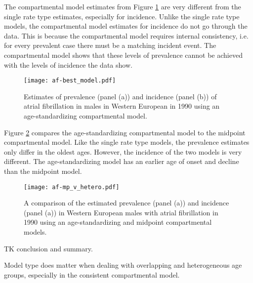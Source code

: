 The compartmental model estimates from Figure \ref{fig:app-af age-stand} 
are very different from the single rate type estimates, especially for incidence.  
Unlike the single rate type models, the compartmental model estimates for 
incidence do not go through the data.  This is because the compartmental model 
requires internal consistency, i.e. for every prevalent case there must be 
a matching incident event.  The compartmental model shows that these levels 
of prevalence cannot be achieved with the levels of incidence the data show.

    \begin{figure}[h]
        \begin{center}
            \texttt{[image: af-best\_model.pdf]}
            \caption{Estimates of prevalence (panel (a)) and incidence (panel (b)) 
              of atrial fibrillation in males in Western European in 1990 using
              an age-standardizing compartmental model.}
            \label{fig:app-af age-stand}
        \end{center}
    \end{figure}

Figure \ref{fig:app-af compare} compares the age-standardizing compartmental 
model to the midpoint compartmental model.  Like the single rate type models, 
the prevalence estimates only differ in the oldest ages.  However, the 
incidence of the two models is very different.  The age-standardizing model 
has an earlier age of onset and decline than the midpoint model.

    \begin{figure}[h]
        \begin{center}
            \texttt{[image: af-mp\_v\_hetero.pdf]}
            \caption{A comparison of the estimated prevalence (panel (a)) and incidence (panel
              (a)) in Western European males with atrial fibrillation in 1990 using
              an age-standardizing and midpoint compartmental models.}
            \label{fig:app-af compare}
        \end{center}
    \end{figure}
    
TK conclusion and summary.

Model type does matter when dealing with overlapping and heterogeneous age 
groups, especially in the consistent compartmental model.

